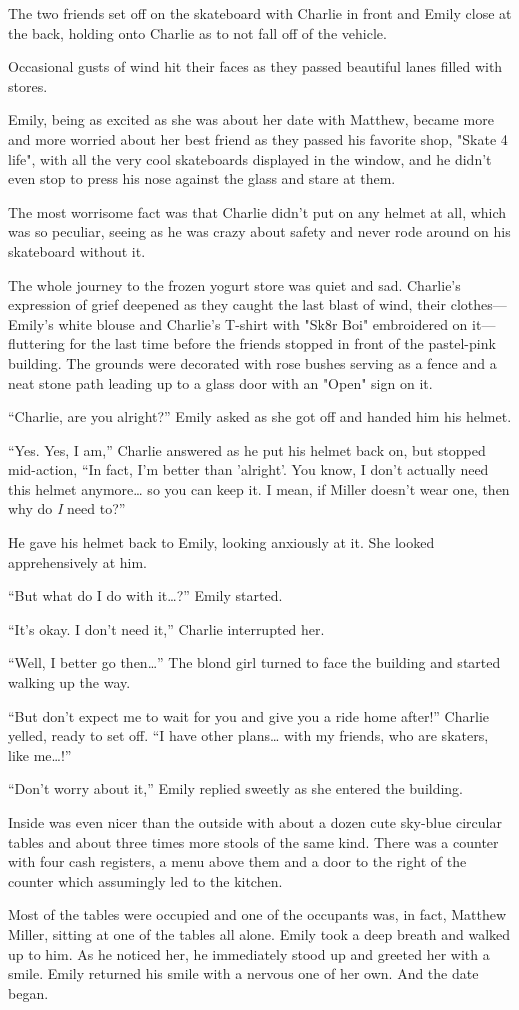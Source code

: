 The two friends set off on the skateboard with Charlie in front and Emily close at the back, holding onto Charlie as to not fall off of the vehicle.

Occasional gusts of wind hit their faces as they passed beautiful lanes filled with stores.

Emily, being as excited as she was about her date with Matthew, became more and more worried about her best friend as they passed his favorite shop, "Skate 4 life", with all the very cool skateboards displayed in the window, and he didn't even stop to press his nose against the glass and stare at them.

The most worrisome fact was that Charlie didn't put on any helmet at all, which was so peculiar, seeing as he was crazy about safety and never rode around on his skateboard without it.

The whole journey to the frozen yogurt store was quiet and sad. Charlie's expression of grief deepened as they caught the last blast of wind, their clothes—Emily's white blouse and Charlie's T-shirt with "Sk8r Boi" embroidered on it—fluttering for the last time before the friends stopped in front of the pastel-pink building. The grounds were decorated with rose bushes serving as a fence and a neat stone path leading up to a glass door with an "Open" sign on it.

“Charlie, are you alright?” Emily asked as she got off and handed him his helmet.

“Yes. Yes, I am,” Charlie answered as he put his helmet back on, but stopped mid-action, “In fact, I'm better than 'alright'. You know, I don't actually need this helmet anymore… so you can keep it. I mean, if Miller doesn't wear one, then why do \textit{I} need to?”

He gave his helmet back to Emily, looking anxiously at it. She looked apprehensively at him.

“But what do I do with it…?” Emily started.

“It's okay. I don't need it,” Charlie interrupted her.

“Well, I better go then…” The blond girl turned to face the building and started walking up the way.

“But don't expect me to wait for you and give you a ride home after!” Charlie yelled, ready to set off. “I have other plans… with my friends, who are skaters, like me…!”

“Don't worry about it,” Emily replied sweetly as she entered the building.

Inside was even nicer than the outside with about a dozen cute sky-blue circular tables and about three times more stools of the same kind. There was a counter with four cash registers, a menu above them and a door to the right of the counter which assumingly led to the kitchen.

Most of the tables were occupied and one of the occupants was, in fact, Matthew Miller, sitting at one of the tables all alone. Emily took a deep breath and walked up to him. As he noticed her, he immediately stood up and greeted her with a smile. Emily returned his smile with a nervous one of her own. And the date began.